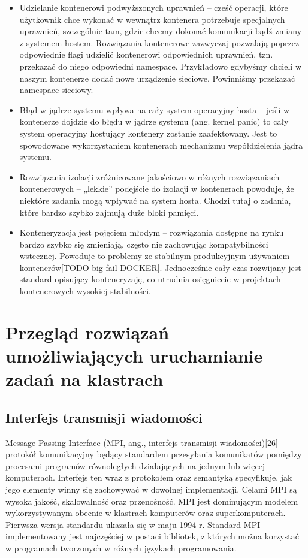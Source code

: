 \documentclass[10pt,a4paper,titlepage,twoside]{report}
\begin{document}
\begin{itemize}
	\item Udzielanie kontenerowi podwyższonych uprawnień – cześć operacji, które użytkownik chce wykonać w wewnątrz kontenera potrzebuje specjalnych uprawnień, szczególnie tam, gdzie chcemy dokonać komunikacji bądź zmiany z systemem hostem. Rozwiązania kontenerowe zazwyczaj pozwalają poprzez odpowiednie flagi udzielić kontenerowi odpowiednich uprawnień, tzn. przekazać do niego odpowiedni namespace. Przykładowo gdybyśmy chcieli w naszym kontenerze dodać nowe urządzenie sieciowe. Powinniśmy przekazać namespace sieciowy.
	\item Błąd w jądrze systemu wpływa na cały system operacyjny hosta – jeśli w kontenerze dojdzie do błędu w jądrze systemu (ang. kernel panic) to cały system operacyjny hostujący kontenery zostanie zaafektowany. Jest to spowodowane wykorzystaniem kontenerach mechanizmu współdzielenia jądra systemu.
	\item Rozwiązania izolacji zróżnicowane jakościowo w różnych rozwiązaniach kontenerowych – „lekkie” podejście do izolacji w kontenerach powoduje, że niektóre zadania mogą wpływać na system hosta. Chodzi tutaj o zadania, które bardzo szybko zajmują duże bloki pamięci.
	\item Konteneryzacja jest pojęciem młodym – rozwiązania dostępne na rynku bardzo szybko się zmieniają, często nie zachowując kompatybilności wstecznej. Powoduje to problemy ze stabilnym produkcyjnym używaniem kontenerów[TODO big fail DOCKER]. Jednocześnie cały czas rozwijany jest standard opisujący konteneryzaję, co utrudnia osięgniecie w projektach kontenerowych wysokiej stabilności.
\end{itemize}

\newpage

\onehalfspacing
\chapter{Przegląd rozwiązań umożliwiających uruchamianie zadań na klastrach}

\section{Interfejs transmisji wiadomości}

\indent \indent Message Passing Interface (MPI, ang., interfejs transmisji wiadomości)[26] - protokół komunikacyjny będący standardem przesyłania komunikatów pomiędzy procesami programów równoległych działających na jednym lub więcej komputerach. Interfejs ten wraz z protokołem oraz semantyką specyfikuje, jak jego elementy winny się zachowywać w dowolnej implementacji. Celami MPI są wysoka jakość, skalowalność oraz przenośność. MPI jest dominującym modelem wykorzystywanym obecnie w klastrach komputerów oraz superkomputerach. Pierwsza wersja standardu ukazała się w maju 1994 r. Standard MPI implementowany jest najczęściej w postaci bibliotek, z których można korzystać w programach tworzonych w różnych językach programowania.
\end{document}
